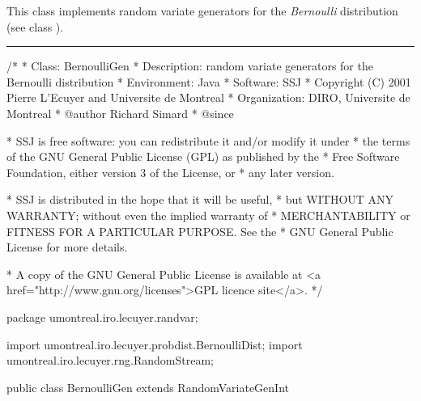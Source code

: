 
This class implements random variate generators for the 
{\em Bernoulli\/} distribution (see class
 ).


 
\bigskip\hrule

\begin{code}
\begin{hide}
/*
 * Class:        BernoulliGen
 * Description:  random variate generators for the Bernoulli distribution
 * Environment:  Java
 * Software:     SSJ 
 * Copyright (C) 2001  Pierre L'Ecuyer and Universite de Montreal
 * Organization: DIRO, Universite de Montreal
 * @author       Richard Simard
 * @since

 * SSJ is free software: you can redistribute it and/or modify it under
 * the terms of the GNU General Public License (GPL) as published by the
 * Free Software Foundation, either version 3 of the License, or
 * any later version.

 * SSJ is distributed in the hope that it will be useful,
 * but WITHOUT ANY WARRANTY; without even the implied warranty of
 * MERCHANTABILITY or FITNESS FOR A PARTICULAR PURPOSE.  See the
 * GNU General Public License for more details.

 * A copy of the GNU General Public License is available at
   <a href="http://www.gnu.org/licenses">GPL licence site</a>.
 */
\end{hide}
package umontreal.iro.lecuyer.randvar;\begin{hide}
import umontreal.iro.lecuyer.probdist.BernoulliDist;
import umontreal.iro.lecuyer.rng.RandomStream;\end{hide}

public class BernoulliGen extends RandomVariateGenInt \begin{hide} {
   protected double p;    
    
\end{hide}\end{code}

